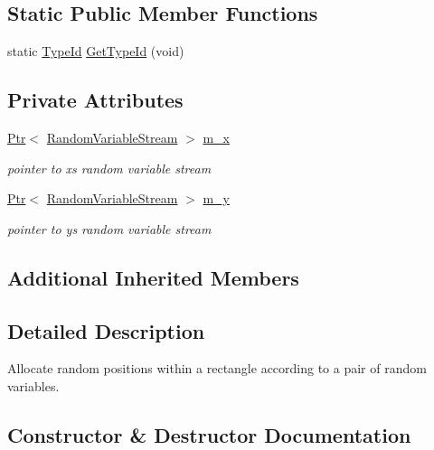 \subsection*{Static Public Member Functions}
\begin{DoxyCompactItemize}
\item 
static \hyperlink{classns3_1_1TypeId}{Type\+Id} \hyperlink{classns3_1_1RandomRectanglePositionAllocator_a2ceac2752f1b1773aabe5f0593cfef21}{Get\+Type\+Id} (void)
\end{DoxyCompactItemize}
\subsection*{Private Attributes}
\begin{DoxyCompactItemize}
\item 
\hyperlink{classns3_1_1Ptr}{Ptr}$<$ \hyperlink{classns3_1_1RandomVariableStream}{Random\+Variable\+Stream} $>$ \hyperlink{classns3_1_1RandomRectanglePositionAllocator_a5568bd1982e2e6fa9fbe63995302eef4}{m\+\_\+x}
\begin{DoxyCompactList}\small\item\em pointer to x\textquotesingle{}s random variable stream \end{DoxyCompactList}\item 
\hyperlink{classns3_1_1Ptr}{Ptr}$<$ \hyperlink{classns3_1_1RandomVariableStream}{Random\+Variable\+Stream} $>$ \hyperlink{classns3_1_1RandomRectanglePositionAllocator_a4a5f9782834fd1798ede42029427cbb0}{m\+\_\+y}
\begin{DoxyCompactList}\small\item\em pointer to y\textquotesingle{}s random variable stream \end{DoxyCompactList}\end{DoxyCompactItemize}
\subsection*{Additional Inherited Members}


\subsection{Detailed Description}
Allocate random positions within a rectangle according to a pair of random variables. 

\subsection{Constructor \& Destructor Documentation}
